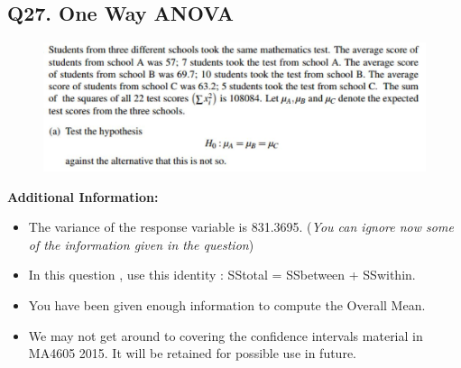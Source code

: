 \documentclass[a4paper,12pt]{article}
\begin{document}
\subsection*{Q27. One Way ANOVA }
\begin{figure}[h!]
	\centering
	\includegraphics[width=0.7\linewidth]{images/Q27review1}
	
\end{figure}
\noindent \textbf{Additional Information: }
\begin{itemize}
	\item The variance of the response variable is 831.3695. (\textit{You can ignore now some of the information given in the question}) 
	\item  In this question , use this identity : SStotal = SSbetween + SSwithin.
	\item  You have been given enough information to compute the Overall Mean.
	\item  We may not get around to covering the confidence intervals material in MA4605 2015. It will be retained for possible use in future.
\end{itemize}
\newpage
\end{document}
